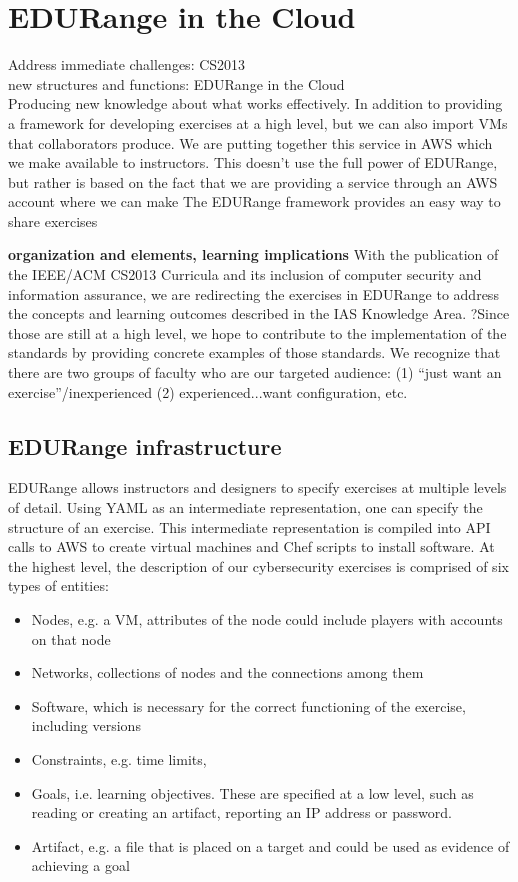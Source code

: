 \section*{EDURange in the Cloud}

Address immediate challenges: CS2013\\
new structures and functions: EDURange in the Cloud\\
Producing new knowledge about what works effectively.  
In addition to providing a framework for developing exercises at a high level, but we can also 
import VMs that collaborators produce.  We are putting together this service in AWS which we make available
to instructors.  This doesn't use the full power of EDURange, but rather is based on the fact that we
are providing a service through an AWS account where we can make 
The EDURange framework provides an easy way to share exercises 

{\bf organization and elements, learning implications}
With the publication of the IEEE/ACM CS2013 Curricula and its inclusion of computer security and 
information assurance, we are redirecting the exercises in EDURange to address the concepts and learning 
outcomes described in the IAS Knowledge Area.  ?Since those are still at a high level, we hope to contribute
to the implementation of the standards by providing concrete examples of those standards.  We recognize that
there are two groups of faculty who are our targeted audience: (1) ``just want an exercise''/inexperienced
 (2) experienced...want configuration, etc.

\subsection*{EDURange infrastructure}
EDURange allows instructors and designers to specify exercises at multiple levels of detail.
Using YAML as an intermediate representation, one can specify the structure of an exercise.
This intermediate representation is compiled into API calls to AWS to create virtual machines and
Chef scripts to install software.  At the highest level, the description of our cybersecurity exercises
is comprised of six types of entities:
\begin{itemize}
  \item Nodes, e.g.  a VM, attributes of the node could include players with accounts on that node
  \item Networks,  collections of nodes and the connections among them
  \item Software, which is necessary for the correct functioning of the exercise, including versions
  \item Constraints, e.g. time limits, 
  \item Goals, i.e. learning objectives.  These are specified at a low level, such as 
    reading or creating an artifact, reporting an IP address or password.
  \item Artifact, e.g. a file that is placed on a target and could be used as evidence of achieving a goal
\end{itemize}

